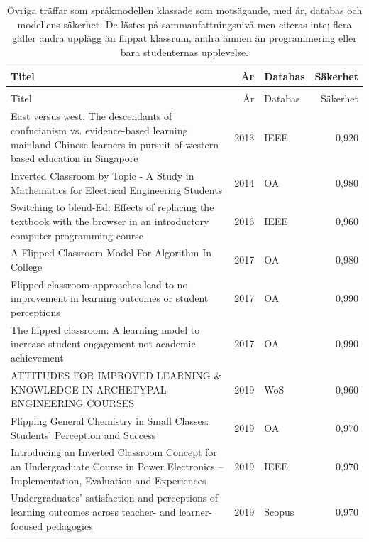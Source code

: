 \begingroup\footnotesize
\begin{longtable}{@{}>{\raggedright\arraybackslash}p{}%
    r>{\raggedright\arraybackslash}p{}r@{}}
  \caption{Övriga träffar som språkmodellen klassade som motsägande, med
    år, databas och modellens säkerhet. De lästes på
    sammanfattningsnivå men citeras inte; flera gäller andra upplägg än
    flippat klassrum, andra ämnen än programmering eller bara studenternas
    upplevelse.}
  \label{tab:recap-flippat-motsager}\\
  \toprule
  Titel & År & Databas & Säkerhet \\
  \midrule
  \endfirsthead
  \multicolumn{4}{@{}l}{\emph{Tabell~\thetable{} (forts.)}}\\
  \toprule
  Titel & År & Databas & Säkerhet \\
  \midrule
  \endhead
  \bottomrule
  \endlastfoot
  East versus west: The descendants of confucianism vs. evidence-based learning mainland Chinese learners in pursuit of western-based education in Singapore & 2013 & IEEE & 0,920 \\
  Inverted Classroom by Topic - A Study in Mathematics for Electrical Engineering Students & 2014 & OA & 0,980 \\
  Switching to blend-Ed: Effects of replacing the textbook with the browser in an introductory computer programming course & 2016 & IEEE & 0,960 \\
  A Flipped Classroom Model For Algorithm In College & 2017 & OA & 0,980 \\
  Flipped classroom approaches lead to no improvement in learning outcomes or student perceptions & 2017 & OA & 0,990 \\
  The flipped classroom: A learning model to increase student engagement not academic achievement & 2017 & OA & 0,990 \\
  ATTITUDES FOR IMPROVED LEARNING \& KNOWLEDGE IN ARCHETYPAL ENGINEERING COURSES & 2019 & WoS & 0,960 \\
  Flipping General Chemistry in Small Classes: Students’ Perception and Success & 2019 & OA & 0,970 \\
  Introducing an Inverted Classroom Concept for an Undergraduate Course in Power Electronics – Implementation, Evaluation and Experiences & 2019 & IEEE & 0,970 \\
  Undergraduates’ satisfaction and perceptions of learning outcomes across teacher- and learner-focused pedagogies & 2019 & Scopus & 0,970 \\

\end{longtable}
